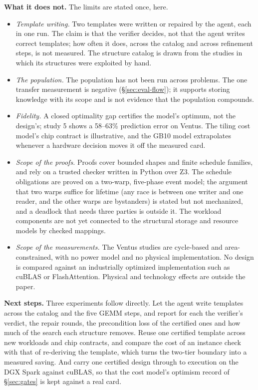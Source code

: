\documentclass[11pt]{article}
\providecommand{\tightlist}{\setlength{\itemsep}{0pt}\setlength{\parskip}{0pt}}
\begin{document}
\textbf{What it does not.} The limits are stated once, here.
\begin{itemize}
\tightlist
\item \emph{Template writing.} Two templates were written or repaired by the agent, each in one run. The claim is that the verifier decides, not that the agent writes correct templates; how often it does, across the catalog and across refinement steps, is not measured. The structure catalog is drawn from the studies in which its structures were exploited by hand.
\item \emph{The population.} The population has not been run across problems. The one transfer measurement is negative (§\ref{sec:eval-flow}); it supports storing knowledge with its scope and is not evidence that the population compounds.
\item \emph{Fidelity.} A closed optimality gap certifies the model's optimum, not the design's; study 5 shows a 58--63\% prediction error on Ventus. The tiling cost model's chip contract is illustrative, and the GB10 model extrapolates whenever a hardware decision moves it off the measured card.
\item \emph{Scope of the proofs.} Proofs cover bounded shapes and finite schedule families, and rely on a trusted checker written in Python over Z3. The schedule obligations are proved on a two-warp, five-phase event model; the argument that two warps suffice for lifetime (any race is between one writer and one reader, and the other warps are bystanders) is stated but not mechanized, and a deadlock that needs three parties is outside it. The workload components are not yet connected to the structural storage and resource models by checked mappings.
\item \emph{Scope of the measurements.} The Ventus studies are cycle-based and area-constrained, with no power model and no physical implementation. No design is compared against an industrially optimized implementation such as cuBLAS or FlashAttention. Physical and technology effects are outside the paper.
\end{itemize}

\textbf{Next steps.} Three experiments follow directly. Let the agent write templates across the catalog and the five GEMM steps, and report for each the verifier's verdict, the repair rounds, the precondition loss of the certified ones and how much of the search each structure removes. Reuse one certified template across new workloads and chip contracts, and compare the cost of an instance check with that of re-deriving the template, which turns the two-tier boundary into a measured saving. And carry one certified design through to execution on the DGX Spark against cuBLAS, so that the cost model's optimism record of §\ref{sec:gates} is kept against a real card.
\end{document}
